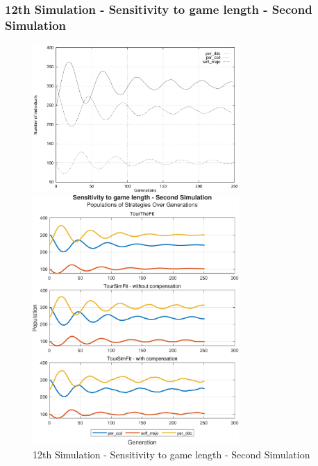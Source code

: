 \documentclass[12pt]{article}
\begin{document}
\subsubsection{12th Simulation - Sensitivity to game length - Second Simulation}
	\begin{figure}[h]
	    \centering
		\includegraphics[width=0.7\textwidth]{RefPaperFigures/fig9b.jpeg}\par\vspace{0.5em}
	    \includegraphics[width=0.7\textwidth]{Sensitivity to game length - Second Simulation.pdf}
	    \caption{12th Simulation - Sensitivity to game length - Second Simulation}
	    \label{fig:Monotonous Convergence}
	\end{figure}
\end{document}
